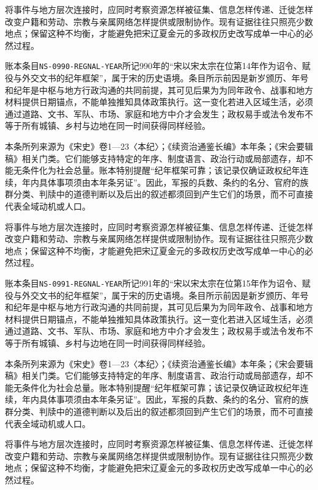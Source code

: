 将事件与地方层次连接时，应同时考察资源怎样被征集、信息怎样传递、迁徙怎样改变户籍和劳动、宗教与亲属网络怎样提供或限制协作。现有证据往往只照亮少数地点；保留这种不均衡，才能避免把宋辽夏金元的多政权历史改写成单一中心的必然过程。

账本条目\texttt{NS-0990-REGNAL-YEAR}所记990年的“宋以宋太宗在位第14年作为诏令、赋役与外交文书的纪年框架”，属于宋的历史语境。条目所示前因是新岁颁历、年号和纪年是中枢与地方行政沟通的共同前提，其可见后果为为同年政令、战事和地方材料提供日期锚点，不能单独推知具体政策执行。这一变化若进入区域生活，必须通过道路、文书、军队、市场、家庭和地方中介才会发生；政权易手或法令发布不等于所有城镇、乡村与边地在同一时间获得同样经验。

本条所列来源为《宋史》卷1—23〈本纪〉；《续资治通鉴长编》本年条；《宋会要辑稿》相关门类。它们能够支持特定的年序、制度语言、政治行动或局部遗存，却不能无条件化为社会总量。账本特别提醒“纪年框架可靠；该记录仅确证政权纪年连续，年内具体事项须由本年条另证”。因此，军报的兵数、条约的名分、官府的族群分类、判牍中的道德判断以及后出的叙述都须回到产生它们的场景，而不可直接代表全域动机或人口。

将事件与地方层次连接时，应同时考察资源怎样被征集、信息怎样传递、迁徙怎样改变户籍和劳动、宗教与亲属网络怎样提供或限制协作。现有证据往往只照亮少数地点；保留这种不均衡，才能避免把宋辽夏金元的多政权历史改写成单一中心的必然过程。

账本条目\texttt{NS-0991-REGNAL-YEAR}所记991年的“宋以宋太宗在位第15年作为诏令、赋役与外交文书的纪年框架”，属于宋的历史语境。条目所示前因是新岁颁历、年号和纪年是中枢与地方行政沟通的共同前提，其可见后果为为同年政令、战事和地方材料提供日期锚点，不能单独推知具体政策执行。这一变化若进入区域生活，必须通过道路、文书、军队、市场、家庭和地方中介才会发生；政权易手或法令发布不等于所有城镇、乡村与边地在同一时间获得同样经验。

本条所列来源为《宋史》卷1—23〈本纪〉；《续资治通鉴长编》本年条；《宋会要辑稿》相关门类。它们能够支持特定的年序、制度语言、政治行动或局部遗存，却不能无条件化为社会总量。账本特别提醒“纪年框架可靠；该记录仅确证政权纪年连续，年内具体事项须由本年条另证”。因此，军报的兵数、条约的名分、官府的族群分类、判牍中的道德判断以及后出的叙述都须回到产生它们的场景，而不可直接代表全域动机或人口。

将事件与地方层次连接时，应同时考察资源怎样被征集、信息怎样传递、迁徙怎样改变户籍和劳动、宗教与亲属网络怎样提供或限制协作。现有证据往往只照亮少数地点；保留这种不均衡，才能避免把宋辽夏金元的多政权历史改写成单一中心的必然过程。
